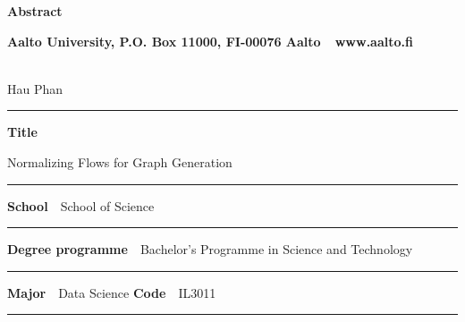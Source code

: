 
\newpage
{}
{}


\begin{spacing}{.88}

	{\parindent0pt %

	{\fontsize{13.9pt}{13.9pt}\selectfont
		\vspace{-8.9mm}\hfill{\bfseries\sffamily\lsstyle Abstract}}

	{\fontsize{9.48pt}{9.48pt}\selectfont
		\vspace{.9mm}\hfill{\bfseries\sffamily\lsstyle Aalto University, P.O. Box 11000, FI-00076 Aalto~~\textcolor{aaltoGray}{www.aalto.fi}}}

	\\
	{\small Hau Phan}

	\vspace{-2.4mm}\rule{\textwidth}{.75pt}

	{\fontsize{10.5pt}{10.5pt}\bfseries\sffamily\lsstyle Title}\\
	\parbox[t]{\textwidth}{\raggedright\small Normalizing Flows for Graph Generation}

	\vspace{.5mm}\rule{\textwidth}{.75pt}

	{\fontsize{10.5pt}{10.5pt}\bfseries\sffamily\lsstyle School}~~{\small School of Science}

	\vspace{-2.4mm}\rule{\textwidth}{.75pt}

	{\fontsize{10.5pt}{10.5pt}\bfseries\sffamily\lsstyle Degree programme}~~{\small Bachelor’s Programme in Science and Technology}

	\vspace{-2.4mm}\rule{\textwidth}{.75pt}

	{\fontsize{10.5pt}{10.5pt}\bfseries\sffamily\lsstyle Major}~~{\small Data Science }\hfill{\fontsize{10.5pt}{10.5pt}\bfseries\sffamily\lsstyle Code}~~{\small IL3011}

	\vspace{-2.4mm}\rule{\textwidth}{.75pt}

}
\end{spacing}
